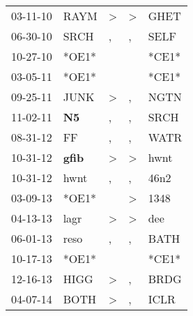 \begin{supertabular}{p{0.07\textwidth}p{0.06\textwidth}p{0.02\textwidth}p{0.02\textwidth}p{0.06\textwidth}}
          03-11-10\textsuperscript{} &           RAYM\textsuperscript{} &     \textgreater &  \textgreater &           GHET\textsuperscript{} \\
          06-30-10\textsuperscript{} &           SRCH\textsuperscript{} &                , &             , &           SELF\textsuperscript{} \\
          10-27-10\textsuperscript{} &                            *OE1* &                  &               &                            *CE1* \\
          03-05-11\textsuperscript{} &                            *OE1* &                  &               &                            *CE1* \\
          09-25-11\textsuperscript{} &           JUNK\textsuperscript{} &     \textgreater &             , &           NGTN\textsuperscript{} \\
          11-02-11\textsuperscript{} &    \textbf{N5\textsuperscript{}} &                , &             , &           SRCH\textsuperscript{} \\
          08-31-12\textsuperscript{} &             FF\textsuperscript{} &                , &             , &           WATR\textsuperscript{} \\
          10-31-12\textsuperscript{} &  \textbf{gfib\textsuperscript{}} &     \textgreater &  \textgreater &           hwnt\textsuperscript{} \\
          10-31-12\textsuperscript{} &           hwnt\textsuperscript{} &                , &             , &           46n2\textsuperscript{} \\
          03-09-13\textsuperscript{} &                            *OE1* &                  &  \textgreater &           1348\textsuperscript{} \\
          04-13-13\textsuperscript{} &           lagr\textsuperscript{} &     \textgreater &  \textgreater &            dee\textsuperscript{} \\
          06-01-13\textsuperscript{} &           reso\textsuperscript{} &                , &             , &           BATH\textsuperscript{} \\
          10-17-13\textsuperscript{} &                            *OE1* &                  &               &                            *CE1* \\
          12-16-13\textsuperscript{} &           HIGG\textsuperscript{} &     \textgreater &             , &           BRDG\textsuperscript{} \\
          04-07-14\textsuperscript{} &           BOTH\textsuperscript{} &     \textgreater &             , &           ICLR\textsuperscript{} \\

\end{supertabular}
